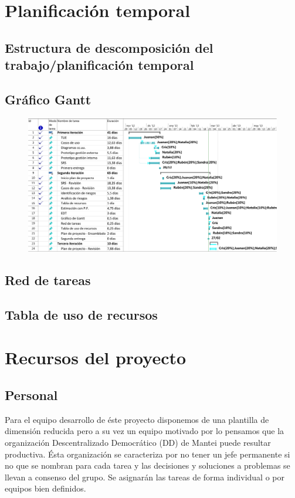 \documentclass[11pt, a4paper, twoside]{report}
\begin{document}
	\section{Planificación temporal}		
		\subsection{Estructura de descomposición del trabajo/planificación temporal}
			 

		\begin{landscape}
		\subsection{Gráfico Gantt}
			\begin{figure}[h] \centering
			\vspace{1.1cm}
			\includegraphics[scale=.8]{planific/Gantt}
			\end{figure}
		\end{landscape}

		\subsection{Red de tareas}
		\subsection{Tabla de uso de recursos}
	\section{Recursos del proyecto}
		\subsection{Personal}
		Para el equipo desarrollo de éste proyecto disponemos de una plantilla de dimensión reducida pero a su vez un equipo motivado por lo pensamos que la organización Descentralizado Democrático (DD) de Mantei puede resultar productiva. Ésta organización se caracteriza por no tener un jefe permanente si no que se nombran para cada tarea y las decisiones y soluciones a problemas se llevan a consenso del grupo. Se asignarán las tareas de forma individual o por equipos bien definidos.
\end{document}
